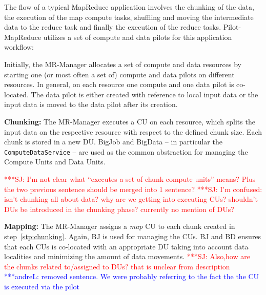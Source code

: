 \documentclass{acm_proc_article-sp}
\newcommand{\jhanote}[1]{ {\textcolor{red} { ***SJ: #1 }}}
\newcommand{\alnote}[1]{ {\textcolor{blue} { ***andreL: #1 }}}
\newcommand{\pnote}[1]{ {\textcolor{magenta} { ***pradeep: #1 }}}
\newcommand{\alnote}[1]{}
\newcommand{\pnote}[1]{}
\newcommand{\jhanote}[1]{}
\newcommand{\upp}{\vspace*{-0.5em}}
\newcommand{\pilotmapreduce}{Pilot-MapReduce\xspace}
\newcommand{\mrmg}{MR-Manager\xspace}
\newcommand{\computeunits}{Compute Units\xspace}
\newcommand{\cu}{CU\xspace}
\newcommand{\dataunits}{Data Units\xspace}
\begin{document}
The flow of a typical MapReduce application involves the chunking of
the data, the execution of the map compute tasks, shuffling and moving
the intermediate data to the reduce task and finally the execution of
the reduce tasks.  \pilotmapreduce utilizes a set of compute and data
pilots for this application workflow: %
\upp
\begin{compactenum}[A.]
\item Initially, the \mrmg allocates a set of compute and data
  resources by starting one (or most often a set of) compute and data
  pilots on different resources.  In general, on each resource one
  compute and one data pilot is co-located. The data pilot is either
  created with reference to local input data or the input data is
  moved to the data pilot after its creation.

\item \textbf{Chunking:} %
The \mrmg executes a \cu on each resource, which splits the
input data on the respective resource with respect to the defined chunk
size.\label{stp:chunking} %
Each chunk is stored in a new DU. BigJob and BigData -- in particular
the \texttt{ComputeDataService} -- are used as the common abstraction
for managing the \computeunits and \dataunits. 
  
  \jhanote{I'm not clear what ``executes a set of chunk compute
    units'' means? Plus the two previous sentence should be merged
    into 1 sentence?} \jhanote{I'm confused: isn't chunking all about
    data? why are we getting into executing CUs? shouldn't DUs be
    introduced in the chunking phase? currently no mention of DUs?}

\item \textbf{Mapping:} The \mrmg assigns a {\it map} CU to each
  chunk created in step~\ref{stp:chunking}. Again, BJ is used for
  managing the CUs. BJ and BD ensures that each CUs is co-located with
  an appropriate DU taking into account data localities and minimizing
  the amount of data movements. %
\jhanote{Also,how are the chunks related to/assigned to DUs? that is
  unclear from description}\alnote{removed sentence. We were probably
  referring to the fact the the CU is executed via the pilot}
	

\end{compactenum}
\end{document}
